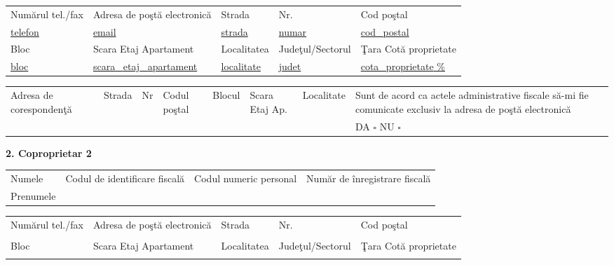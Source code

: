\documentclass[8pt,a4paper,landscape]{extarticle}
\newcommand{\fillline}[1][6cm]{\underline{\hspace{#1}}}
\newcommand{\checkboxempty}{$\square$}
\begin{document}
\begin{tabularx}{\textwidth}{|X|X|X|X|X|}
\hline
Numărul tel./fax & Adresa de poştă electronică & Strada & Nr. & Cod poştal \\
\underline{ {{telefon}} } & \underline{ {{email}} } & \underline{ {{strada}} } & \underline{ {{numar}} } & \underline{ {{cod_postal}} } \\
\hline
Bloc & Scara \quad Etaj \quad Apartament & Localitatea & Judeţul/Sectorul & Ţara \quad Cotă proprietate \\
\underline{ {{bloc}} } & \underline{ {{scara}} \ {{etaj}} \ {{apartament}} } & \underline{ {{localitate}} } & \underline{ {{judet}} } & \underline{ {{cota_proprietate}} \% } \\
\hline
\end{tabularx}

\begin{tabularx}{\textwidth}{|m{2.5cm}|X|X|X|X|X|X|m{4cm}|}
\hline
\multirow{2}{2.5cm}{Adresa de corespondenţă} & Strada & Nr & Codul poştal & Blocul & Scara \quad Etaj \quad Ap. & Localitate & Sunt de acord ca actele administrative fiscale să-mi fie comunicate exclusiv la adresa de poştă electronică \\
& \fillline[2cm] & \fillline[1cm] & \fillline[1.5cm] & \fillline[1cm] & \fillline[2cm] & \fillline[2cm] & DA \checkboxempty \hspace{0.5cm} NU \checkboxempty \\
\hline
\end{tabularx}

\vspace{0.15cm}

\textbf{2. Coproprietar 2}\\
\begin{tabularx}{\textwidth}{|X|X|X|X|}
\hline
Numele \fillline[5cm] & Codul de identificare fiscală & Codul numeric personal & Număr de înregistrare fiscală \\
Prenumele \fillline[5cm] & \fillline[4cm] & \fillline[4cm] & \fillline[4cm] \\
\hline
\end{tabularx}

\begin{tabularx}{\textwidth}{|X|X|X|X|X|}
\hline
Numărul tel./fax & Adresa de poştă electronică & Strada & Nr. & Cod poştal \\
\fillline[3cm] & \fillline[4cm] & \fillline[4cm] & \fillline[1.5cm] & \fillline[2cm] \\
\hline
Bloc & Scara \quad Etaj \quad Apartament & Localitatea & Judeţul/Sectorul & Ţara \quad Cotă proprietate \\
\fillline[1.5cm] & \fillline[3cm] & \fillline[3cm] & \fillline[3cm] & \fillline[3cm] \\
\hline
\end{tabularx}
\end{document}
